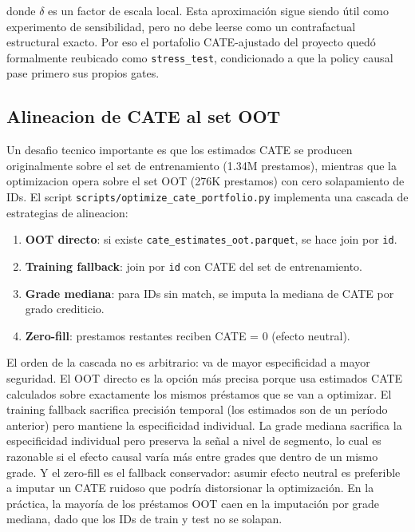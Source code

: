 \documentclass[
  spanish,
  11pt,
  letterpaper,
]{scrbook}
\providecommand{\tightlist}{%
  \setlength{\itemsep}{0pt}\setlength{\parskip}{0pt}}
\theoremstyle{plain}
\theoremstyle{remark}
\begin{document}
donde \(\delta\) es un factor de escala local. Esta aproximación sigue
siendo útil como experimento de sensibilidad, pero no debe leerse como
un contrafactual estructural exacto. Por eso el portafolio CATE-ajustado
del proyecto quedó formalmente reubicado como \texttt{stress\_test},
condicionado a que la policy causal pase primero sus propios gates.

\subsection{Alineacion de CATE al set
OOT}\label{alineacion-de-cate-al-set-oot}

Un desafio tecnico importante es que los estimados CATE se producen
originalmente sobre el set de entrenamiento (1.34M prestamos), mientras
que la optimizacion opera sobre el set OOT (276K prestamos) con cero
solapamiento de IDs. El script
\texttt{scripts/optimize\_cate\_portfolio.py} implementa una cascada de
estrategias de alineacion:

\begin{enumerate}
\def\labelenumi{\arabic{enumi}.}
\tightlist
\item
  \textbf{OOT directo}: si existe \texttt{cate\_estimates\_oot.parquet},
  se hace join por \texttt{id}.
\item
  \textbf{Training fallback}: join por \texttt{id} con CATE del set de
  entrenamiento.
\item
  \textbf{Grade mediana}: para IDs sin match, se imputa la mediana de
  CATE por grado crediticio.
\item
  \textbf{Zero-fill}: prestamos restantes reciben CATE = 0 (efecto
  neutral).
\end{enumerate}

El orden de la cascada no es arbitrario: va de mayor especificidad a
mayor seguridad. El OOT directo es la opción más precisa porque usa
estimados CATE calculados sobre exactamente los mismos préstamos que se
van a optimizar. El training fallback sacrifica precisión temporal (los
estimados son de un período anterior) pero mantiene la especificidad
individual. La grade mediana sacrifica la especificidad individual pero
preserva la señal a nivel de segmento, lo cual es razonable si el efecto
causal varía más entre grades que dentro de un mismo grade. Y el
zero-fill es el fallback conservador: asumir efecto neutral es
preferible a imputar un CATE ruidoso que podría distorsionar la
optimización. En la práctica, la mayoría de los préstamos OOT caen en la
imputación por grade mediana, dado que los IDs de train y test no se
solapan.
\end{document}
